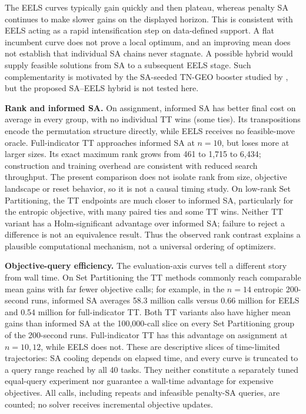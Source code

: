 The EELS curves typically gain quickly and then plateau, whereas penalty SA
continues to make slower gains on the displayed horizon. This is consistent
with EELS acting as a rapid intensification step on data-defined support.
A flat incumbent curve does not prove a local optimum, and an improving
mean does not establish that individual SA chains never stagnate. A possible
hybrid would supply feasible solutions from SA to a subsequent EELS stage.
Such complementarity is motivated by the SA-seeded TN-GEO booster studied
by \citet{Alcazar2024}, but the proposed SA--EELS hybrid is not tested here.

\textbf{Rank and informed SA.} On assignment, informed SA has better final
cost on average in every group, with no individual TT wins (some ties).
Its transpositions encode
the permutation structure directly, while EELS receives no feasible-move
oracle. Full-indicator TT approaches informed SA at $n=10$, but loses more
at larger sizes. Its exact maximum rank grows from 461 to 1,715 to 6,434;
construction and training overhead are consistent with reduced search
throughput. The present comparison does not isolate rank from size,
objective landscape or reset behavior, so it is not a causal timing study.
On low-rank Set Partitioning, the TT endpoints are much closer to informed
SA, particularly for the entropic objective, with many paired ties and
some TT wins. Neither TT variant has a Holm-significant advantage over
informed SA; failure to reject a difference is not an equivalence result.
Thus the observed rank contrast explains a plausible computational mechanism,
not a universal ordering of optimizers.

\textbf{Objective-query efficiency.} The evaluation-axis curves tell a
different story from wall time. On Set Partitioning the TT methods commonly
reach comparable mean gains with far fewer objective calls; for example,
in the $n=14$ entropic 200-second runs, informed SA averages 58.3 million
calls versus 0.66 million for EELS and 0.54 million for full-indicator TT.
Both TT variants also have higher mean gains than informed SA at the
100,000-call slice on every Set Partitioning group of the 200-second runs.
Full-indicator TT has this advantage on assignment at $n=10,12$, while
EELS does not. These are descriptive slices of time-limited trajectories:
SA cooling depends on elapsed time, and every curve is truncated to a query
range reached by all 40 tasks. They neither constitute a separately tuned
equal-query experiment nor guarantee a wall-time advantage for expensive
objectives. All calls, including repeats and infeasible penalty-SA queries,
are counted; no solver receives incremental objective updates.

